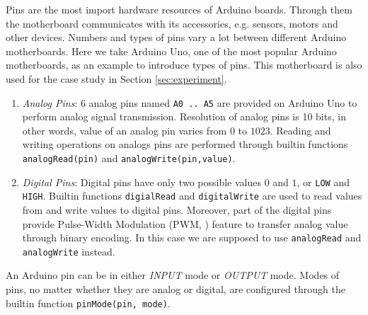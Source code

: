  Pins are the most import hardware resources of Arduino boards. Through them the motherboard communicates with its accessories, e.g. sensors, motors and other devices. Numbers and types of pins vary a lot between different Arduino motherboards. Here we take Arduino Uno, one of the most popular Arduino motherboards, as an example to introduce types of pins. This motherboard is also used for the case study in Section \ref{sec:experiment}.

\begin{enumerate}
    \item \emph{Analog Pins}: 6 analog pins named \texttt{A0 .. A5} are provided on Arduino Uno to perform analog signal transmission. Resolution of analog pins is 10 bits, in other words, value of an analog pin varies from $0$ to $1023$. Reading and writing operations on analogs pins are performed through builtin functions \texttt{analogRead(pin)} and \texttt{analogWrite(pin,value)}.
    \item \emph{Digital Pins}: Digital pins have only two possible values $0$ and $1$, or \texttt{LOW} and \texttt{HIGH}. Builtin functions \texttt{digialRead} and \texttt{digitalWrite} are used to read values from and write values to digital pins. Moreover, part of the digital pins provide Pulse-Width Modulation (PWM, \cite{linkpwm}) feature to transfer analog value through binary encoding. In this case we are supposed to use \texttt{analogRead} and \texttt{analogWrite} instead.
\end{enumerate}

An Arduino pin can be in either \emph{INPUT} mode or \emph{OUTPUT} mode. Modes of pins, no matter whether they are analog or digital, are configured through the builtin function \texttt{pinMode(pin, mode)}.

